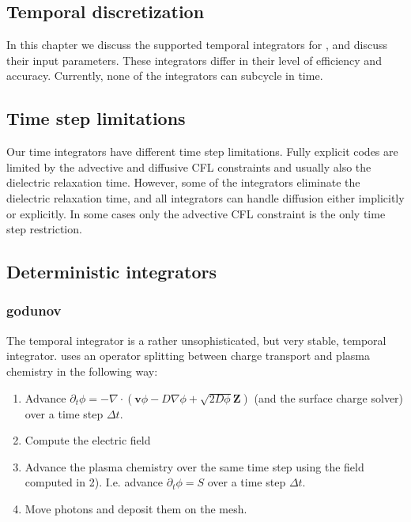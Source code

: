 \documentclass[letterpaper,10pt,english]{sphinxmanual}
\begin{document}
\subsection{Temporal discretization}
\label{\detokenize{MinimalPlasmaModel:temporal-discretization}}
In this chapter we discuss the supported temporal integrators for , and discuss their input parameters. These integrators differ in their level of efficiency and accuracy. Currently, none of the integrators can subcycle in time.


\subsection{Time step limitations}
\label{\detokenize{MinimalPlasmaModel:time-step-limitations}}
Our time integrators have different time step limitations. Fully explicit codes are limited by the advective and diffusive CFL constraints and usually also the dielectric relaxation time. However, some of the  integrators eliminate the dielectric relaxation time, and all integrators can handle diffusion either implicitly or explicitly. In some cases only the advective CFL constraint is the only time step restriction.


\subsection{Deterministic integrators}
\label{\detokenize{MinimalPlasmaModel:deterministic-integrators}}

\subsubsection{godunov}
\label{\detokenize{MinimalPlasmaModel:godunov}}\label{\detokenize{MinimalPlasmaModel:chap-godunov}}
The  temporal integrator is a rather unsophisticated, but very stable, temporal integrator.  uses an operator splitting between charge transport and plasma chemistry in the following way:
\begin{enumerate}
%
\item {} 
Advance \(\partial_t\phi = -\nabla\cdot\left(\mathbf{v}\phi - D\nabla\phi + \sqrt{2D\phi}\mathbf{Z}\right)\) (and the surface charge solver) over a time step \(\Delta t\).

\item {} 
Compute the electric field

\item {} 
Advance the plasma chemistry over the same time step using the field computed in 2). I.e. advance \(\partial_t\phi = S\) over a time step \(\Delta t\).

\item {} 
Move photons and deposit them on the mesh.

\end{enumerate}
\end{document}
